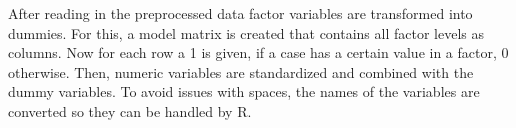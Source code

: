
After reading in the preprocessed data factor variables are transformed
into dummies. For this, a model matrix is created that contains all
factor levels as columns. Now for each row a 1 is given, if a case
has a certain value in a factor, 0 otherwise. Then, numeric variables
are standardized and combined with the dummy variables. To avoid issues
with spaces, the names of the variables are converted so they can
be handled by R.
